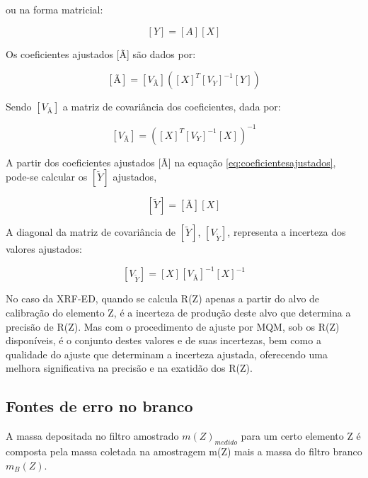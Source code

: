 ou na forma matricial:

\begin{equation}
  \label{eq:polinomioMatriz}
  [Y] = [A][X]
\end{equation}

Os coeficientes ajustados [Ã] são dados por:

\begin{equation}
  \label{eq:coeficientesajustados}
  [Ã] = [V_{Ã}] ([X]^T {[V_Y]}^{-1} [Y])
\end{equation}

Sendo $[V_{Ã}]$ a matriz de covariância dos coeficientes, dada por:

\begin{equation}
  \label{eq:matrizcovariancia}
  [V_{Ã}] = ([X]^T [V_Y]^{-1} [X])^{-1}
\end{equation}

A partir dos coeficientes ajustados [Ã] na equação \ref{eq:coeficientesajustados},
pode-se calcular os $[\tilde{Y}]$ ajustados,

\begin{equation}
  \label{eq:polinomioajustado}
  [\tilde{Y}] = [Ã][X]
\end{equation}

A diagonal da matriz de covariância de $[\tilde{Y}]$, $[V_{\tilde{Y}}]$, 
representa a incerteza dos valores ajustados:

\begin{equation}
  \label{eq:matrizcovarianciaY}
  [V_{\tilde{Y}}] = [X] [V_{Ã}]^{-1} [X]^{-1}
\end{equation}

No caso da XRF-ED, quando se calcula R(Z) apenas a partir do alvo de 
calibração do elemento Z, é a incerteza de produção deste alvo que determina 
a precisão de R(Z). Mas com o procedimento de ajuste por MQM, sob os 
R(Z) disponíveis, é o conjunto destes valores e de suas incertezas, bem como a 
qualidade do ajuste que determinam a incerteza ajustada, oferecendo uma 
melhora significativa na precisão e na exatidão dos R(Z).

\subsection{Fontes de erro no branco}

A massa depositada no filtro amostrado $m(Z)_{medido}$ para um certo elemento Z
é composta pela massa coletada na amostragem m(Z) mais a massa do filtro 
branco $m_{B}(Z)$.

